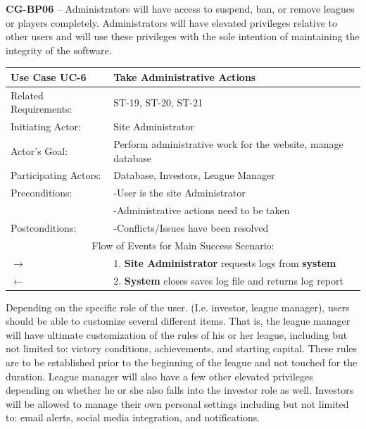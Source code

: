 \textbf{CG-BP06} – Administrators will have access to suspend, ban, or remove leagues or players
completely. Administrators will have elevated privileges relative to other users and will
use these privileges with the sole intention of maintaining the integrity of the software.\\


\begin{centering}
\renewcommand\arraystretch{1.3} %
\label{UC-6}
\begin{longtable}{|p{1.2in} p{5in}|}
\hline
\bfseries{\color{color1}Use Case UC-6} &
\bfseries{\color{color1}Take Administrative Actions} \\
\hline
Related Requirements: & ST-19, ST-20, ST-21 \\
Initiating Actor:     & Site Administrator \\
Actor's Goal:         & Perform administrative work for the website, manage database \\
Participating Actors: & Database, Investors, League Manager \\
Preconditions:        & -User is the site Administrator \\
                      & -Administrative actions need to be taken \\
Postconditions:       & -Conflicts/Issues have been resolved \\
\hline
\multicolumn{2}{|c|}{\color{color1}Flow of Events for Main Success Scenario:}\\
\hline

$\rightarrow$ & 1. \textbf{Site Administrator} requests logs from \textbf{system} \\
$\leftarrow$ & 2. \textbf{System} closes saves log file and returns log report \\
\hline

\end{longtable}
\end{centering}

Depending on the specific role of the user. (I.e. investor, league manager), users should be
able to customize several different items. That is, the league manager will have ultimate
customization of the rules of his or her league, including but not limited to: victory
conditions, achievements, and starting capital. These rules are to be established prior to
the beginning of the league and not touched for the duration. League manager will also have a
few other elevated privileges depending on whether he or she also falls into the investor role
as well. Investors will be allowed to manage their own personal settings including but not
limited to: email alerts, social media integration, and notifications.\\

